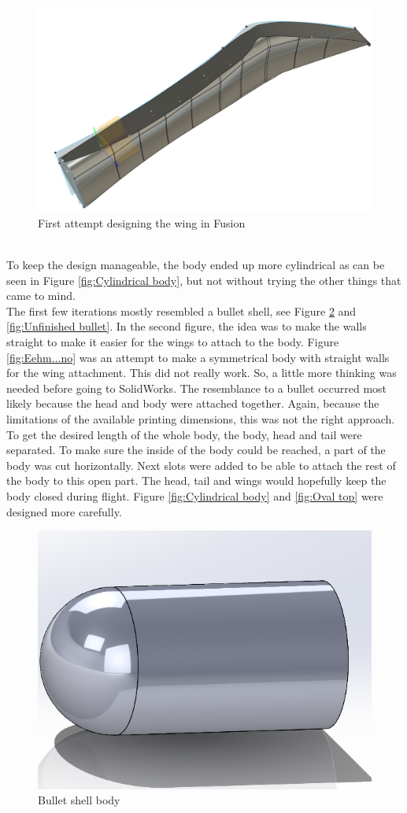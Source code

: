 \begin{figure}
    \centering
    \includegraphics[width=0.5\linewidth]{images/Fusion wing fail.png}
    \caption{First attempt designing the wing in Fusion}
    \label{fig:Fusion wing fail}
\end{figure}\\

To keep the design manageable, the body ended up more cylindrical as can be seen in Figure \ref{fig:Cylindrical body}, but not without trying the other things that came to mind.\\

The first few iterations mostly resembled a bullet shell, see Figure \ref{fig:bullet shell} and \ref{fig:Unfinished bullet}. In the second figure, the idea was to make the walls straight to make it easier for the wings to attach to the body. Figure \ref{fig:Eehm...no} was an attempt to make a symmetrical body with straight walls for the wing attachment. This did not really work. So, a little more thinking was needed before going to SolidWorks.
The resemblance to a bullet occurred most likely because the head and body were attached together. Again, because the limitations of the available printing dimensions, this was not the right approach. \\

To get the desired length of the whole body, the body, head and tail were separated. To make sure the inside of the body could be reached, a part of the body was cut horizontally. Next slots were added to be able to attach the rest of the body to this open part. The head, tail and wings would hopefully keep the body closed during flight. Figure \ref{fig:Cylindrical body} and \ref{fig:Oval top} were designed more carefully.

\begin{figure}
    \centering
    \includegraphics[width=0.5\linewidth]{images/Bullet shell.png}
    \caption{Bullet shell body}
    \label{fig:bullet shell}
\end{figure}


